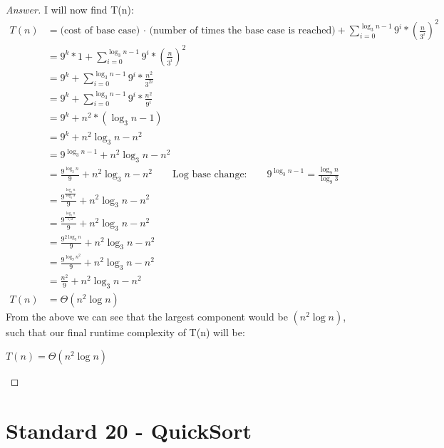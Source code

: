 \documentclass[11pt]{article}
\theoremstyle{definition}
\theoremstyle{definition}
\theoremstyle{definition}
\begin{document}
\begin{proof}[Answer]
I will now find T(n):\\
\begin{align*}
T(n) &= \textrm{(cost of base case) · (number of times the base case is reached)} + \sum_{i=0}^{\log_3 n - 1}  9^{i} * (\frac{n}{3^i})^2 \\
&= 9^k * 1 + \sum_{i=0}^{\log_3 n - 1}  9^{i} * (\frac{n}{3^i})^2 \\
&= 9^k + \sum_{i=0}^{\log_3 n - 1}  9^{i} * \frac{n^2}{3^{2i}}\\
&= 9^k + \sum_{i=0}^{\log_3 n - 1}  9^{i} * \frac{n^2}{9^i}\\
&= 9^k + n^2 * (\log_3 n - 1) \\
&= 9^k + n^2\log_3 n - n^2 \\
&= 9^{\log_3 n - 1} + n^2\log_3 n - n^2 \\
&= \frac{9^{\log_3 n}}{9} + n^2\log_3 n - n^2 \qquad \textrm{Log base change:} \qquad 9^{\log_3 n - 1} = \frac{\log_9 n}{\log_9 3}\\
&= \frac{9^{\frac{\log_9 n}{\log_9 3}}}{9} + n^2\log_3 n - n^2 \\
&= \frac{9^{\frac{\log_9 n}{1/2}}}{9} + n^2\log_3 n - n^2 \\
&= \frac{9^{2\log_9 n}}{9} + n^2\log_3 n - n^2 \\
&= \frac{9^{\log_9 n^2}}{9} + n^2\log_3 n - n^2 \\
&= \frac{n^2}{9} + n^2\log_3 n - n^2 \\
T(n) &= \Theta(n^2\log n)
\end{align*}
From the above we can see that the largest component would be $(n^2\log n)$, such that our final runtime complexity of T(n) will be: \\
\begin{center}
$T(n) = \Theta(n^2\log n)$
\end{center}
\end{proof}

\newpage
\section{Standard 20 - QuickSort}
\end{document}
